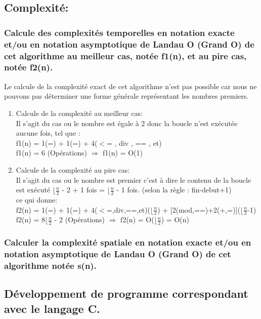 \documentclass[12pt]{article}
\begin{document}
\subsection{Complexité:}

\subsubsection{Calcule des complexités temporelles en notation exacte et/ou en notation asymptotique de Landau O (Grand O) de  cet  algorithme au meilleur cas, notée f1(n), et au pire cas, notée f2(n). }
Le calcule de la complexité exact de cet algorithme n'est pas possible car nous ne pouvons pas déterminer une forme générale représentant les nombres premiers.
 
\begin{enumerate}
	\item Calcule de la complexité au meilleur cas:
	\\
	Il s'agit du cas ou le nombre est égale à 2 donc la boucle n'est exécutée aucune fois, tel que :
	\\
	f1(n) = 1(=) + 1(=) + 4($<$= , div , == , et) 
	\\
	\color{blue}
	f1(n) = 6 (Opérations) $\Rightarrow$ f1(n) = O(1)
	\color{black}
	\\
	\item Calcule de la complexité au pire cas:
	\\
	Il s'agit du cas ou le nombre est premier c'est à dire le contenu de la boucle est exécuté $\lfloor{\frac{n}{2}}$ - 2 + 1 fois = $\lfloor{\frac{n}{2}}$ - 1 fois.
	(selon la règle : fin-debut+1)
	\\
	ce qui donne:
	\\
	f2(n) = 1(=) + 1(=) + 4($<$=,div,==,et)($\lfloor{\frac{n}{2}}$) + [2(mod,==)+2(+,=)]($\lfloor{\frac{n}{2}}$-1) 
	\\
	\color{blue}
	f2(n) = 8$\lfloor{\frac{n}{2}}$ - 2 (Opérations) $\Rightarrow$ f2(n) = O($\lfloor{\frac{n}{2}}$) = O(n)
	\color{black}
\end{enumerate}




\subsubsection{Calculer la complexité spatiale en notation exacte et/ou en notation asymptotique de Landau O (Grand O) de  cet  algorithme notée s(n).}



\subsection{Développement de programme correspondant avec le langage C.}
\end{document}
